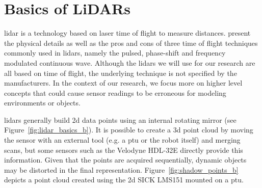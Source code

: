 \section{Basics of LiDARs}
\label{sec:chap_lidar_basics}

\gls*{lidar} is a technology based on laser time of flight to measure distances. \citet{lidar_basics} present the physical details as well as the pros and cons of three time of flight techniques commonly used in \gls*{lidar}s, namely the pulsed, phase-shift and frequency modulated continuous wave. Although the \gls*{lidar}s we will use for our research are all based on time of flight, the underlying technique is not specified by the manufacturers. In the context of our research, we focus more on higher level concepts that could cause sensor readings to be erroneous for modeling environments or objects.

\gls*{lidar}s generally build \gls*{2d} data points using an internal rotating mirror (see Figure~\ref{fig:lidar_basics_b}). It is possible to create a \gls*{3d} point cloud by moving the sensor with an external tool (e.g. a \gls*{ptu} or the robot itself) and merging scans, but some sensors such as the Velodyne HDL-32E directly provide this information. Given that the points are acquired sequentially, dynamic objects may be distorted in the final representation. Figure~\ref{fig:shadow_points_b} depicts a point cloud created using the \gls*{2d} SICK LMS151 mounted on a \gls*{ptu}.

